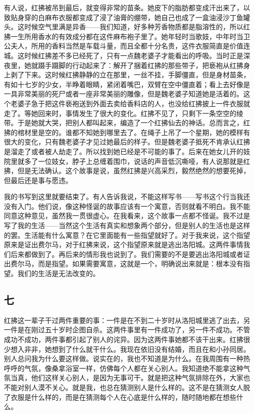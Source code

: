 有人说，红拂被吊到最后，就变得非常的苗条。她皮下的脂肪都变成汗出来了，以致贴身穿的白麻布衣服都变成了浸了油膏的绷带，她自己也成了一盒油浸沙丁鱼罐头。这时候空气里满是异香——我们知道，好多种芳香物质都是脂溶性的，所以红拂一生所用香水的有效成分都在这件麻布袍子里了。她年轻时当歌妓，中年时当卫公夫人，所用的香料当然是车载斗量，而且全都十分名贵，这件衣服简直是价值连城。这时候红拂差不多已经死了，只有一点魏老婆子才能看出的呼吸。当时正是深夜里，她就蹑手蹑脚的行动起来了：解开了捆着红拂的那些带子，把亵袍从红拂身上剥了下来。这时候红拂静静的立在那里，一丝不挂，手脚僵直，但是身材苗条，有如十七岁的少女，半睁着眼睛，紧闭着嘴巴，双臂在空中僵直着；看上去好像是一具非常美丽的死尸或者一座非常美丽的雕像，但是魏老婆子知道她是活着的。这个老婆子急于把这件亵袍送到外面去卖给香料店的人，也没给红拂披上一件衣服就走了。等她回来时，事情发生了很大的变化。红拂不见了，只剩下一条空空的绫带。于是她就大哭，把别人都叫起来，编造了一个红拂仙去的神话。总而言之，红拂的棺材里是空的。谁都不知她到哪里去了。在绳子上吊了一个星期，她的模样有很大的变化，只有魏老婆子才见过她最后的样子。但是魏老婆子抵死不肯承认红拂是溜走了或者被人劫走了。所以找到她已经是不可能的事了。后来在她女儿开的妓院里就多了一位妓女，脖子上总缠着围巾，说话的声音低沉嘶哑，有人说那就是红拂，但是无法确认。这个故事是说，虽然红拂是兴高采烈，毅然绝然的想要死掉，但最后还是事与愿违。 

我的书写到这里就要结束了。有人告诉我说，不能这样写书——写书这个行当我还没有入门。他们说，像这种怪诞的故事应该有一个寓意，否则就看不明白。我不能同意这种意见，虽然我一贯很虚心。在我看来，这个故事一点都不怪诞。我不过是写了我的生活——当然这个生活有真实和想象两个部分，但是别人的生活也是这样的罢。生活能有什么寓意？在它里面能有一些指望就好了。对于我来说，这个指望原来是证出费尔马，对于红拂来说，这个指望原来就是逃出洛阳城。这两件事情我们后来都做到了。再后来的情形我也说到了。我们需要的不是要逃出洛阳城或者证出费尔马，而是指望。如果需要寓意，这就是一个，明确说出来就是：根本没有指望。我们的生活是无法改变的。 

\subsection{七} 

红拂这一辈子干过两件重要的事：一件是在不到二十岁时从洛阳城里逃了出去，另一件是在刚过五十岁时企图自杀。这两件事里有一件成功了，另一件不成功。不管成功不成功，两件事都引起了别人的诧异。因为这两件事她都不该干出来。红拂很少想入非非，她想到了什么就干什么。我现在依旧没有结婚，而且在和小孙同居。别人总问我为什么要这样做。说实在的，我也不知道是为什么。在我周围有一种热呼呼的气氛，像桑拿浴室一样，仿佛每个人都在关心别人。我知道绝不能拿这种气氛当真，他们这样关心别人，是因为无事可干。就是把这种气氛排除在外，大家也不能对别人漠不关心。就是我，也总在猜测别人是什么样的。这不是在猜测女人脱了衣服是什么样的，而是在猜测每个人在心底是什么样的，随时随地都在想些什么。 

